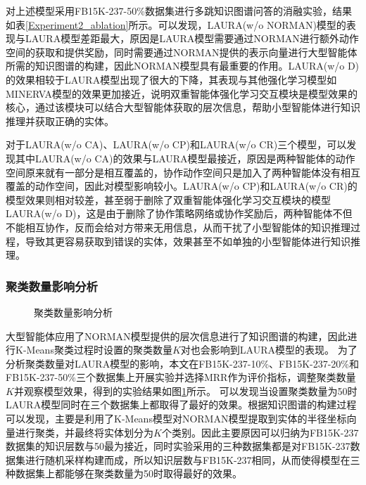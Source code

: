 \documentclass[algorithmlist, AutoFakeBold, AutoFakeSlant, figurelist, tablelist, nomlist, engineering, openany]{seuthesix} %
\begin{document}
对上述模型采用FB15K-237-50\%数据集进行多跳知识图谱问答的消融实验，结果如表\ref{Experiment2_ablation}所示。可以发现，LAURA(w/o NORMAN)模型的表现与LAURA模型差距最大，原因是LAURA模型需要通过NORMAN进行额外动作空间的获取和提供奖励，同时需要通过NORMAN提供的表示向量进行大型智能体所需的知识图谱的构建，因此NORMAN模型具有最重要的作用。LAURA(w/o D)的效果相较于LAURA模型出现了很大的下降，其表现与其他强化学习模型如MINERVA模型的效果更加接近，说明双重智能体强化学习交互模块是模型效果的核心，通过该模块可以结合大型智能体获取的层次信息，帮助小型智能体进行知识推理并获取正确的实体。

对于LAURA(w/o CA)、LAURA(w/o CP)和LAURA(w/o CR)三个模型，可以发现其中LAURA(w/o CA)的效果与LAURA模型最接近，原因是两种智能体的动作空间原来就有一部分是相互覆盖的，协作动作空间只是加入了两种智能体没有相互覆盖的动作空间，因此对模型影响较小。LAURA(w/o CP)和LAURA(w/o CR)的模型效果则相对较差，甚至弱于删除了双重智能体强化学习交互模块的模型LAURA(w/o D)，这是由于删除了协作策略网络或协作奖励后，两种智能体不但不能相互协作，反而会给对方带来无用信息，从而干扰了小型智能体的知识推理过程，导致其更容易获取到错误的实体，效果甚至不如单独的小型智能体进行知识推理。

\subsubsection{聚类数量影响分析}
\begin{figure}[t]
  \centering
  \caption{聚类数量影响分析}
  \label{Experiment2_layer}
\end{figure}

大型智能体应用了NORMAN模型提供的层次信息进行了知识图谱的构建，因此进行K-Means聚类过程时设置的聚类数量$K$对也会影响到LAURA模型的表现。
为了分析聚类数量对LAURA模型的影响，本文在FB15K-237-10\%、FB15K-237-20\%和FB15K-237-50\%三个数据集上开展实验并选择MRR作为评价指标，调整聚类数量$K$并观察模型效果，得到的实验结果如图\ref{Experiment2_layer}所示。
可以发现当设置聚类数量为50时LAURA模型同时在三个数据集上都取得了最好的效果。根据知识图谱的构建过程可以发现，主要是利用了K-Means模型对NORMAN模型提取到实体的半径坐标向量进行聚类，并最终将实体划分为$K$个类别。因此主要原因可以归纳为FB15K-237数据集的知识层数与50最为接近，同时实验采用的三种数据集都是对FB15K-237数据集进行随机采样构建而成，所以知识层数与FB15K-237相同，从而使得模型在三种数据集上都能够在聚类数量为50时取得最好的效果。
\end{document}
